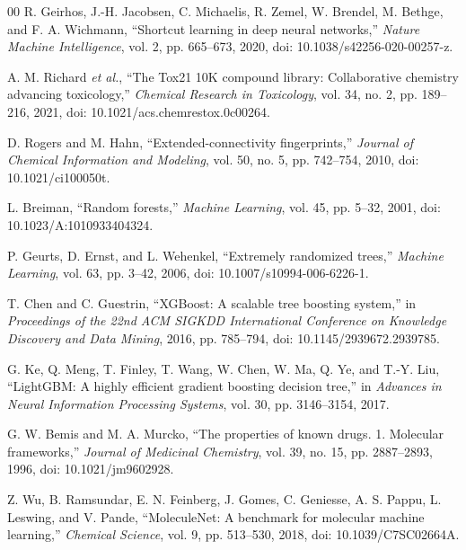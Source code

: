 \documentclass[conference]{IEEEtran}
\begin{document}
\balance
\begin{thebibliography}{00}
R. Geirhos, J.-H. Jacobsen, C. Michaelis, R. Zemel, W. Brendel, M. Bethge, and F. A. Wichmann, ``Shortcut learning in deep neural networks,'' \textit{Nature Machine Intelligence}, vol. 2, pp. 665--673, 2020, doi: 10.1038/s42256-020-00257-z.

A. M. Richard \textit{et al.}, ``The Tox21 10K compound library: Collaborative chemistry advancing toxicology,'' \textit{Chemical Research in Toxicology}, vol. 34, no. 2, pp. 189--216, 2021, doi: 10.1021/acs.chemrestox.0c00264.

D. Rogers and M. Hahn, ``Extended-connectivity fingerprints,'' \textit{Journal of Chemical Information and Modeling}, vol. 50, no. 5, pp. 742--754, 2010, doi: 10.1021/ci100050t.

L. Breiman, ``Random forests,'' \textit{Machine Learning}, vol. 45, pp. 5--32, 2001, doi: 10.1023/A:1010933404324.

P. Geurts, D. Ernst, and L. Wehenkel, ``Extremely randomized trees,'' \textit{Machine Learning}, vol. 63, pp. 3--42, 2006, doi: 10.1007/s10994-006-6226-1.

T. Chen and C. Guestrin, ``XGBoost: A scalable tree boosting system,'' in \textit{Proceedings of the 22nd ACM SIGKDD International Conference on Knowledge Discovery and Data Mining}, 2016, pp. 785--794, doi: 10.1145/2939672.2939785.

G. Ke, Q. Meng, T. Finley, T. Wang, W. Chen, W. Ma, Q. Ye, and T.-Y. Liu, ``LightGBM: A highly efficient gradient boosting decision tree,'' in \textit{Advances in Neural Information Processing Systems}, vol. 30, pp. 3146--3154, 2017.

G. W. Bemis and M. A. Murcko, ``The properties of known drugs. 1. Molecular frameworks,'' \textit{Journal of Medicinal Chemistry}, vol. 39, no. 15, pp. 2887--2893, 1996, doi: 10.1021/jm9602928.

Z. Wu, B. Ramsundar, E. N. Feinberg, J. Gomes, C. Geniesse, A. S. Pappu, L. Leswing, and V. Pande, ``MoleculeNet: A benchmark for molecular machine learning,'' \textit{Chemical Science}, vol. 9, pp. 513--530, 2018, doi: 10.1039/C7SC02664A.
\end{thebibliography}
\end{document}
